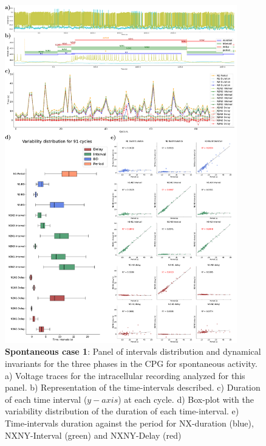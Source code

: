 \begin{figure}[htbp]
	\centering
	\includegraphics[width=0.9\textwidth]{./img/invariants/data/SUSSEX/prep2/images/3phases/panel_with_intervals.pdf}
	\caption{\textbf{Spontaneous case 1}: Panel of intervals distribution and dynamical invariants for the three phases in the CPG for spontaneous activity. a) Voltage traces for the intracellular recording analyzed for this panel. b) Representation of the time-intervals described. c) Duration of each time interval ($y-axis$) at each cycle. d) Box-plot with the variability distribution of the duration of each time-interval. e) Time-intervals duration against the period for NX-duration (blue), NXNY-Interval (green) and NXNY-Delay (red)}
	\label{fig:prep2 invariants}
\end{figure}

